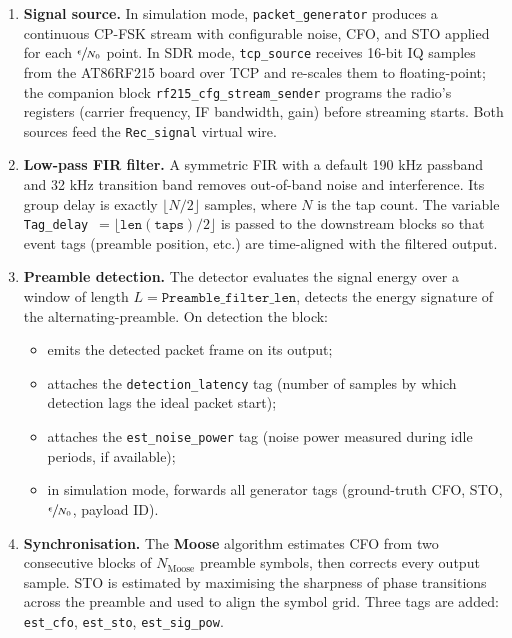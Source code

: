 \begin{enumerate}
  \item \textbf{Signal source.}
    In simulation mode, \texttt{packet\_generator} produces a continuous CP-FSK stream with configurable noise, CFO, and STO applied for each $\sfrac{\epsilon}{N_0}$ point.
    In SDR mode, \texttt{tcp\_source} receives 16-bit IQ samples from the
    AT86RF215 board over TCP and re-scales them to floating-point; the companion     block \texttt{rf215\_cfg\_stream\_sender} programs the radio's registers  (carrier frequency, IF bandwidth, gain) before streaming starts.
    Both sources feed the \texttt{Rec\_signal} virtual wire.

  \item \textbf{Low-pass FIR filter.}
    A symmetric  FIR with a default 190 kHz passband and 32 kHz
    transition band removes out-of-band noise and interference.
    Its group delay is exactly $\lfloor N/2 \rfloor$ samples, where $N$ is the tap count.
    The variable \texttt{Tag\_delay}~$= \lfloor \mathtt{len(taps)} / 2 \rfloor$ is passed to the downstream blocks so that event tags (preamble position, etc.) are time-aligned with the filtered output.

  \item \textbf{Preamble detection.}
    The detector evaluates the signal energy over a window of length $L =
    \mathtt{Preamble\_filter\_len}$, detects the energy signature of the
    alternating-preamble. On detection the block:
    \begin{itemize}
      \item emits the detected packet frame on its output;
      \item attaches the \texttt{detection\_latency} tag (number of samples by which detection lags the ideal packet start);
      \item attaches the \texttt{est\_noise\_power} tag (noise power measured during idle periods, if available);
      \item in simulation mode, forwards all generator tags (ground-truth CFO, STO, $\sfrac{\epsilon}{N_0}$, payload ID).
    \end{itemize}

  \item \textbf{Synchronisation.}
    The \textbf{Moose} algorithm estimates CFO from two consecutive blocks of $N_{\mathrm{Moose}}$ preamble symbols, then corrects every output sample.
    STO is estimated by maximising the sharpness of phase transitions across the
    preamble and used to align the symbol grid.
    Three tags are added: \texttt{est\_cfo}, \texttt{est\_sto},
    \texttt{est\_sig\_pow}.


\end{enumerate}
